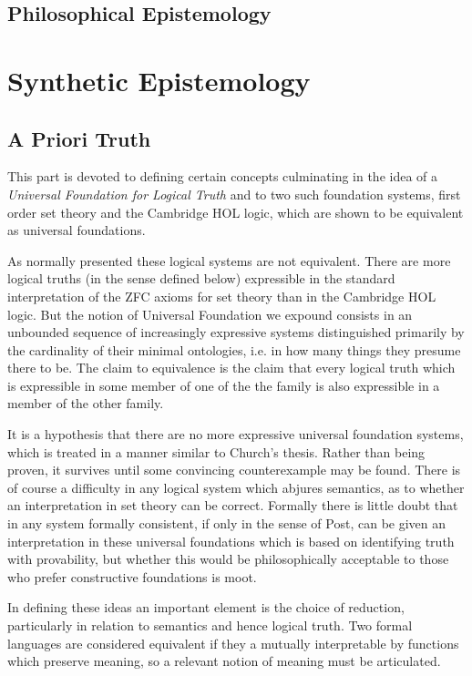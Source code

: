\documentclass[10pt,titlepage]{book}
\begin{document}
\chapter{Philosophical Epistemology}

\part{Synthetic Epistemology}

\chapter{A Priori Truth}

This part is devoted to defining certain concepts culminating in the idea of a \emph{Universal Foundation for Logical Truth} and to two such foundation systems, first order set theory and the Cambridge HOL logic, which are shown to be equivalent as universal foundations.

As normally presented these logical systems are not equivalent.
There are more logical truths (in the sense defined below) expressible in the standard interpretation of the ZFC axioms for set theory than in the Cambridge HOL logic.
But the notion of Universal Foundation we expound consists in an unbounded sequence of increasingly expressive systems distinguished primarily by the cardinality of their minimal ontologies, i.e. in how many things they presume there to be.
The claim to equivalence is the claim that every logical truth which is expressible in some member of one of the the family is also expressible in a member of the other family.

It is a hypothesis that there are no more expressive universal foundation systems, which is treated in a manner similar to Church's thesis.
Rather than being proven, it survives until some convincing counterexample may be found.
There is of course a difficulty in any logical system which abjures semantics, as to whether an interpretation in set theory can be correct.
Formally there is little doubt that in any system formally consistent, if only in the sense of Post, can be given an interpretation in these universal foundations which is based on identifying truth with provability, but whether this would be philosophically acceptable to those who prefer constructive foundations is moot.

In defining these ideas an important element is the choice of reduction, particularly in relation to semantics and hence logical truth.
Two formal languages are considered equivalent if they a mutually interpretable by functions which preserve meaning, so a relevant notion of meaning must be articulated.
\end{document}
